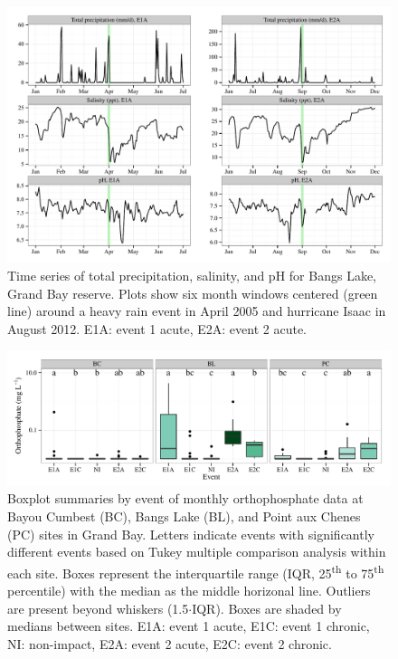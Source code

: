 \documentclass[letterpaper,12pt]{article}\usepackage[]{graphicx}\usepackage[]{color}
\makeatletter
\def\maxwidth{ %
  \ifdim\Gin@nat@width>\linewidth
    \linewidth
  \else
    \Gin@nat@width
  \fi
}
\makeatother
\begin{document}
\begin{figure}[!ht]

{\centering \includegraphics[width=\maxwidth]{figs/tsplotexp-1} 

}

\caption[Time series of total precipitation, salinity, and pH for Bangs Lake, Grand Bay reserve]{Time series of total precipitation, salinity, and pH for Bangs Lake, Grand Bay reserve.  Plots show six month windows centered (green line) around a heavy rain event in April 2005 and hurricane Isaac in August 2012.  E1A: event 1 acute, E2A: event 2 acute.}\label{fig:tsplotexp}
\end{figure}


\clearpage

\begin{figure}[!ht]

{\centering \includegraphics[width=\maxwidth]{figs/tukey-1} 

}

\caption[Boxplot summaries by event of monthly orthophosphate data at Bayou Cumbest (BC), Bangs Lake (BL), and Point aux Chenes (PC) sites in Grand Bay]{Boxplot summaries by event of monthly orthophosphate data at Bayou Cumbest (BC), Bangs Lake (BL), and Point aux Chenes (PC) sites in Grand Bay.  Letters indicate events with significantly different events based on Tukey multiple comparison analysis within each site.  Boxes represent the interquartile range (IQR, 25\textsuperscript{th} to 75\textsuperscript{th} percentile) with the median as the middle horizonal line.  Outliers are present beyond whiskers (1.5$\cdot$IQR). Boxes are shaded by medians between sites.  E1A: event 1 acute, E1C: event 1 chronic, NI: non-impact, E2A: event 2 acute, E2C: event 2 chronic.}\label{fig:tukey}
\end{figure}
\end{document}
